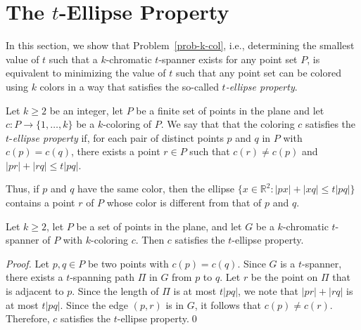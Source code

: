 \documentclass[pdftex,leqno,fleqn,12pts]{llncs}
\begin{document}
\section{The $t$-Ellipse Property}\label{section-ellipse}
In this section, we show that Problem~\ref{prob-k-col}, i.e., 
determining the smallest value of $t$ such that a $k$-chromatic 
$t$-spanner exists for any point set $P$, is equivalent to minimizing 
the value of $t$ such that any point set can be colored using $k$ 
colors in a way that satisfies the so-called \emph{$t$-ellipse property}. 

\begin{definition} 
Let $k \geq 2$ be an integer, let $P$ be a finite set of points in the 
plane and let $c: P \rightarrow \{1,\ldots, k\}$ be a $k$-coloring of 
$P$. We say that that the coloring $c$ satisfies the 
$t$-\emph{ellipse property} if, for each pair of distinct points
$p$ and $q$ in $P$ with $c(p)=c(q)$, there exists a point $r \in P$
such that $c(r) \neq c(p)$ and $|pr|+|rq|\leq t|pq|$.
\end{definition}

Thus, if $p$ and $q$ have the same color, then the ellipse 
$\{ x \in \mathbb{R}^2 : |px|+|xq|\leq t|pq| \}$ contains a point $r$ of 
$P$ whose color is different from that of $p$ and $q$.   

\begin{proposition}  \label{helloworld}  
Let $k \geq 2$, let $P$ be a set of points in the plane, and let $G$ be 
a $k$-chromatic $t$-spanner of $P$ with $k$-coloring $c$. Then $c$ 
satisfies the $t$-ellipse property.
\end{proposition}
\begin{proof}
Let $p,q\in P$ be two points with $c(p)=c(q)$. Since $G$ is a $t$-spanner, there exists a $t$-spanning
path $\Pi$ in $G$ from $p$ to $q$. Let $r$ be the point on $\Pi$ that is adjacent to $p$. Since the length of $\Pi$ is at most $t|pq|$, we note that $|pr|+|rq|$ is at most $t|pq|$. Since the edge $(p,r)$
is in $G$, it follows that $c(p)\neq c(r)$. Therefore, $c$ satisfies the $t$-ellipse property.\qed
\end{proof}
\end{document}
